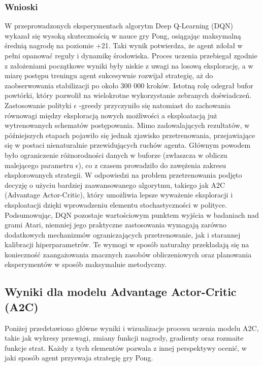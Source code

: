 \documentclass[a4paper, 12pt]{article}
\numberwithin{equation}{section}
\begin{document}
    \subsubsection{Wnioski}
    W przeprowadzonych eksperymentach algorytm Deep Q-Learning (DQN) wykazał się wysoką skutecznością w nauce gry Pong, osiągając maksymalną średnią nagrodę na poziomie +21. Taki wynik potwierdza, że agent zdołał w pełni opanować reguły i dynamikę środowiska. Proces uczenia przebiegał zgodnie z założeniami  początkowe wyniki były niskie z uwagi na losową eksplorację, a w miarę postępu treningu agent sukcesywnie rozwijał strategię, aż do zaobserwowania stabilizacji po około 300 000 kroków.
    Istotną rolę odegrał bufor powtórki, który pozwolił na wielokrotne wykorzystanie zebranych doświadczeń. Zastosowanie polityki \( \epsilon \) -greedy przyczyniło się natomiast do zachowania równowagi między eksploracją nowych możliwości a eksploatacją już wytrenowanych schematów postępowania. Mimo zadowalających rezultatów, w późniejszych etapach pojawiło się jednak zjawisko przetrenowania, przejawiające się w postaci nienaturalnie przewidujących ruchów agenta. Głównym powodem było ograniczenie różnorodności danych w buforze (zwłaszcza w obliczu malejącego parametru \( \epsilon \)), co z czasem prowadziło do zawężenia zakresu eksplorowanych strategii.
    W odpowiedzi na problem przetrenowania podjęto decyzję o użyciu bardziej zaawansowanego algorytmu, takiego jak A2C (Advantage Actor-Critic), który umożliwia lepsze wyważenie eksploracji i eksploatacji dzięki wprowadzeniu elementu stochastyczności w polityce. Podsumowując, DQN pozostaje wartościowym punktem wyjścia w badaniach nad grami Atari, niemniej jego praktyczne zastosowania wymagają zarówno dodatkowych mechanizmów ograniczających przetrenowanie, jak i starannej kalibracji hiperparametrów. Te wymogi w sposób naturalny przekładają się na konieczność zaangażowania znacznych zasobów obliczeniowych oraz planowania eksperymentów w sposób maksymalnie metodyczny.
    \subsection{Wyniki dla modelu Advantage Actor-Critic (A2C)}
    Poniżej przedstawiono główne wyniki i wizualizacje procesu uczenia modelu A2C, takie jak wykresy przewagi, zmiany funkcji nagrody, gradienty oraz rozmaite funkcje strat. Każdy z tych elementów pozwala z innej perspektywy ocenić, w jaki sposób agent przyswaja strategię gry Pong.
\end{document}
